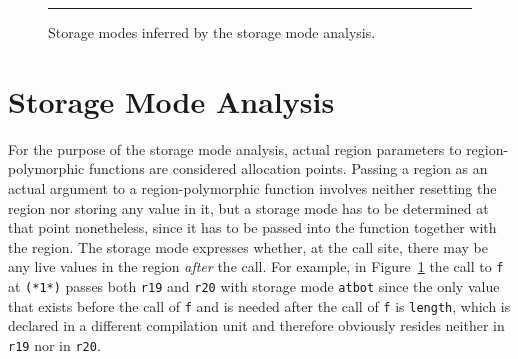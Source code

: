 \documentclass[12pt]{book}
\begin{document}
\begin{figure}
{%
}
\caption{Storage modes inferred by the storage mode analysis.}
\bigskip
\label{sma1.fig}
\hrule
\end{figure}

\section{Storage Mode Analysis}
\label{sma.sec}
For the purpose of the storage mode analysis, actual region
parameters to region-polymorphic functions are considered allocation
points. Passing a region as an actual argument to a region-polymorphic
function involves neither resetting the region nor storing any value
in it, but a storage mode has to be determined at that point
nonetheless, since it has to be passed into the function together with
the region. The storage mode expresses whether, at the call site,
there may be any live values in the region {\em after} the call. For
example, in Figure~\ref{sma1.fig} the call to {\tt f}
at {\tt (*1*)} passes both {\tt r19} and {\tt r20} with storage
mode {\tt atbot} since the only value that exists before the call
of {\tt f} and is needed after the call of {\tt f} is {\tt length},
which is declared in a different compilation unit and therefore
obviously  resides neither in {\tt r19} nor in {\tt r20}.
\end{document}
